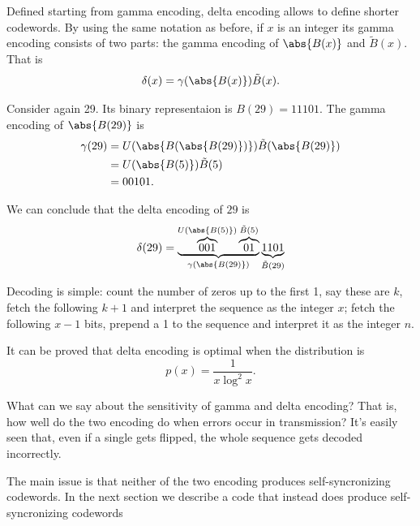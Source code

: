 \documentclass{subfiles}
\begin{document}
    Defined starting from gamma encoding,
        delta encoding allows to define shorter codewords\footnotemark.
        By using the same notation as before, if \(x\) is an integer 
        its gamma encoding consists of two parts: the gamma encoding of 
        \(\abs{B(x)}\) and \(\tilde{B}(x)\). That is
        \[
            \delta(x) = \gamma(\abs{B(x)}) \tilde{B}(x).
        \]


    \begin{example*}
        Consider again 29. Its binary representaion is \(B(29) = 11101\).
            The gamma encoding of \(\abs{B(29)}\) is 
            \[\begin{aligned}
                \gamma(29) & = U(\abs{B(\abs{B(29)})}) \tilde{B}(\abs{B(29)}) \\ 
                    & = U(\abs{B(5)}) \tilde{B}(5) \\ 
                    & = 001 01.
            \end{aligned}\]
            
            We can conclude that the delta encoding of \(29\) is 
            \[
                \delta(29) = \underbrace{
                        \overbrace{001}^{U(\abs{B(5)})}
                        \overbrace{01}^{\tilde{B}(5)}
                    }_{\gamma({\abs{B(29)}})}
                    \underbrace{1101}_{\tilde{B}(29)}
            \]
    \end{example*}

    Decoding is simple: count the number of zeros up to the first 1,
        say these are \(k\), fetch the following \(k + 1\) and interpret the sequence 
        as the integer \(x\); fetch the following \(x - 1\) bits, 
        prepend a 1 to the sequence and interpret it as the integer \(n\).

    It can be proved that delta encoding is optimal when the distribution is 
    \[
        p(x) = \frac{1}{x \log^{2} x}.
    \]

    \begin{remark*}
        What can we say about the sensitivity of gamma and delta encoding?
            That is, how well do the two encoding do when errors occur in transmission?
            It's easily seen that, even if a single gets flipped, the whole sequence 
            gets decoded incorrectly.
        
        The main issue is that neither of the two encoding produces self-syncronizing codewords.
            In the next section we describe a code that instead does produce self-syncronizing
            codewords

    \end{remark*}
\end{document}
